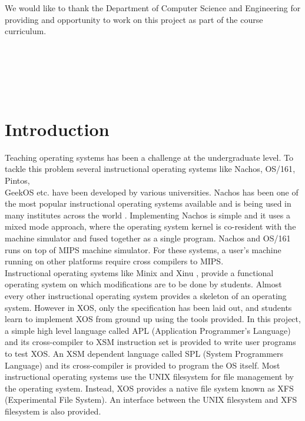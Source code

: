 \documentclass[10pt]{report}
\begin{document}
We would like to thank the Department of Computer Science and Engineering for providing and opportunity to work on this project as part of the course curriculum.
\\
\\ 
\\
 \\ 
\\
\\
\newpage


\chapter{Introduction}

Teaching operating systems has been a challenge at the undergraduate level. To tackle this problem several instructional operating systems like Nachos\cite{nachos}, OS/161\cite{os161}, Pintos\cite{Pintos}, \\GeekOS \cite{survey} etc. have been developed by various universities. Nachos\cite{nachos} has been one of the most popular instructional operating systems available and is being used in many institutes across the world \cite{survey}. Implementing Nachos is simple and it uses a mixed mode approach, where the operating system kernel is co-resident with the machine simulator and fused together as a single program. Nachos\cite{nachos} and OS/161\cite{os161} runs on top of MIPS machine simulator. For these systems, a user's machine running on other platforms require cross compilers to MIPS. \\

 
Instructional operating systems like Minix and Xinu \cite{survey}, provide a functional operating system on which modifications are to be done by students. Almost every other instructional operating system provides a skeleton of an operating system. However in XOS, only the specification has been laid out, and students learn to implement XOS from ground up using the tools provided. In this project, a simple high level language called APL (Application Programmer's Language) and its cross-compiler to XSM instruction set is provided to write user programs to test XOS. An XSM dependent language called SPL (System Programmers Language) and its cross-compiler is provided to program the OS itself. Most instructional operating systems use the UNIX filesystem for file management by the operating system. Instead, XOS provides a native file system known as XFS (Experimental File System). An interface between the UNIX filesystem and XFS filesystem is also provided.  \\
\end{document}
